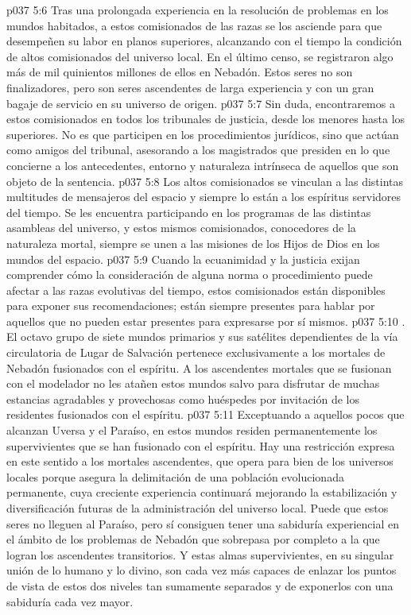 \vs p037 5:6 Tras una prolongada experiencia en la resolución de problemas en los mundos habitados, a estos comisionados de las razas se los asciende para que desempeñen su labor en planos superiores, alcanzando con el tiempo la condición de altos comisionados del universo local. En el último censo, se registraron algo más de mil quinientos millones de ellos en Nebadón. Estos seres no son finalizadores, pero son seres ascendentes de larga experiencia y con un gran bagaje de servicio en su universo de origen.
\vs p037 5:7 Sin duda, encontraremos a estos comisionados en todos los tribunales de justicia, desde los menores hasta los superiores. No es que participen en los procedimientos jurídicos, sino que actúan como amigos del tribunal, asesorando a los magistrados que presiden en lo que concierne a los antecedentes, entorno y naturaleza intrínseca de aquellos que son objeto de la sentencia.
\vs p037 5:8 Los altos comisionados se vinculan a las distintas multitudes de mensajeros del espacio y siempre lo están a los espíritus servidores del tiempo. Se les encuentra participando en los programas de las distintas asambleas del universo, y estos mismos comisionados, conocedores de la naturaleza mortal, siempre se unen a las misiones de los Hijos de Dios en los mundos del espacio.
\vs p037 5:9 Cuando la ecuanimidad y la justicia exijan comprender cómo la consideración de alguna norma o procedimiento puede afectar a las razas evolutivas del tiempo, estos comisionados están disponibles para exponer sus recomendaciones; están siempre presentes para hablar por aquellos que no pueden estar presentes para expresarse por sí mismos.
\vs p037 5:10 \pc {}. El octavo grupo de siete mundos primarios y sus satélites dependientes de la vía circulatoria de Lugar de Salvación pertenece exclusivamente a los mortales de Nebadón fusionados con el espíritu. A los ascendentes mortales que se fusionan con el modelador no les atañen estos mundos salvo para disfrutar de muchas estancias agradables y provechosas como huéspedes por invitación de los residentes fusionados con el espíritu.
\vs p037 5:11 Exceptuando a aquellos pocos que alcanzan Uversa y el Paraíso, en estos mundos residen permanentemente los supervivientes que se han fusionado con el espíritu. Hay una restricción expresa en este sentido a los mortales ascendentes, que opera para bien de los universos locales porque asegura la delimitación de una población evolucionada permanente, cuya creciente experiencia continuará mejorando la estabilización y diversificación futuras de la administración del universo local. Puede que estos seres no lleguen al Paraíso, pero sí consiguen tener una sabiduría experiencial en el ámbito de los problemas de Nebadón que sobrepasa por completo a la que logran los ascendentes transitorios. Y estas almas supervivientes, en su singular unión de lo humano y lo divino, son cada vez más capaces de enlazar los puntos de vista de estos dos niveles tan sumamente separados y de exponerlos con una sabiduría cada vez mayor.
